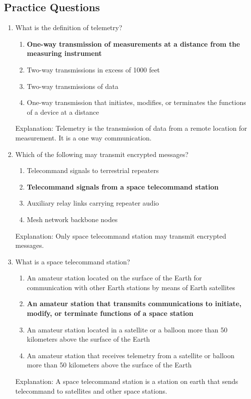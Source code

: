 \subsection*{Practice Questions}
\begin{enumerate}
  \item What is the definition of telemetry?
    \begin{enumerate}
        \item \textbf {One-way transmission of measurements at a distance from the measuring instrument}
        \item  Two-way transmissions in excess of 1000 feet
       \item  Two-way transmissions of data
        \item  One-way transmission that initiates, modifies, or terminates the functions of a device at a distance
    \end{enumerate}
    \textcolor{myred}{Explanation:}
    Telemetry is the transmission of data from a remote location for measurement. It is a one way communication.

    \item Which of the following may transmit encrypted messages?
     \begin{enumerate}
        \item Telecommand signals to terrestrial repeaters
        \item \textbf {Telecommand signals from a space telecommand station}
        \item  Auxiliary relay links carrying repeater audio
        \item  Mesh network backbone nodes
    \end{enumerate}
      \textcolor{myred}{Explanation:}
    Only space telecommand station may transmit encrypted messages.
    
    \item What is a space telecommand station?
    \begin{enumerate}
      \item An amateur station located on the surface of the Earth for communication with other Earth stations by means of Earth satellites
        \item \textbf {An amateur station that transmits communications to initiate, modify, or terminate functions of a space station}
     \item  An amateur station located in a satellite or a balloon more than 50 kilometers above the surface of the Earth
        \item  An amateur station that receives telemetry from a satellite or balloon more than 50 kilometers above the surface of the Earth
    \end{enumerate}
       \textcolor{myred}{Explanation:}
    A space telecommand station is a station on earth that sends telecommand to satellites and other space stations.


\end{enumerate}

